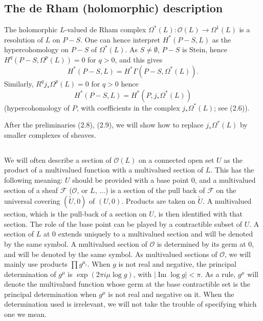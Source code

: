\documentclass[12pt,a4paper]{article}
\theoremstyle{plain}
\theoremstyle{definition}
\theoremstyle{remark}
\numberwithin{equation}{section}
\begin{document}
\subsection{The de Rham (holomorphic) description}
The holomorphic $L$-valued de Rham complex $\Omega^*(L): \mathcal{O}(L) \to \Omega^1(L)$ is a resolution of $L$ on $P-S$. One can hence interpret $H^*(P-S, L)$ as the hypercohomology on $P-S$ of $\Omega^*(L)$. As $S \neq \emptyset$, $P-S$ is Stein, hence $H^q(P-S, \Omega^p(L)) = 0$ for $q > 0$, and this gives
\begin{equation}\label{eq:2.7.1}
H^*(P-S, L) = H^*\Gamma(P-S, \Omega^*(L)).
\end{equation}
Similarly, $R^qj_*\Omega^p(L) = 0$ for $q > 0$ hence
\[
H^*(P-S, L) = H^*(P, j_*\Omega^*(L))
\]
(hypercohomology of $P$, with coefficients in the complex $j_*\Omega^*(L)$; see (2.6)).

After the preliminaries (2.8), (2.9), we will show how to replace $j_*\Omega^*(L)$ by smaller complexes of sheaves.

\subsection{}
We will often describe a section of $\mathcal{O}(L)$ on a connected open set $U$ as the product of a multivalued function with a multivalued section of $L$. This has the following meaning: $U$ should be provided with a base point $0$, and a multivalued section of a sheaf $\mathscr{F}$ ($\mathcal{O}$, or $L$, $\ldots$) is a section of the pull back of $\mathscr{F}$ on the universal covering $(\widetilde{U}, 0)$ of $(U, 0)$. Products are taken on $\widetilde{U}$. A multivalued section, which is the pull-back of a section on $U$, is then identified with that section. The role of the base point can be played by a contractible subset of $U$. A section of $L$ at $0$ extends uniquely to a multivalued section and will be denoted by the same symbol. A multivalued section of $\mathcal{O}$ is determined by its germ at $0$, and will be denoted by the same symbol. As multivalued sections of $\mathcal{O}$, we will mainly use products $\prod g^{\mu_i}$. When $g$ is not real and negative, the principal determination of $g^{\mu}$ is $\exp(2\pi i \mu \log g)$, with $|\operatorname{Im} \log g| < \pi$. As a rule, $g^{\mu}$ will denote the multivalued function whose germ at the base contractible set is the principal determination when $g^{\mu}$ is not real and negative on it. When the determination used is irrelevant, we will not take the trouble of specifying which one we mean.
\end{document}
